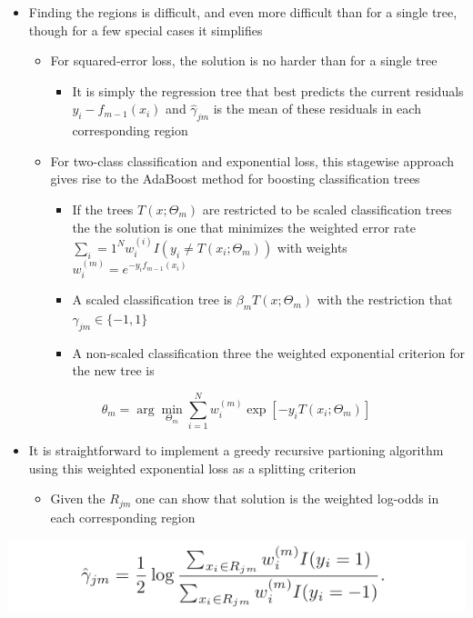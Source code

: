 \documentclass[11pt]{article}
\begin{document}
\begin{itemize}
\item Finding the regions is difficult, and even more difficult than for a single tree, though for a few special cases it simplifies
\begin{itemize}
\item For squared-error loss, the solution is no harder than for a single tree
\begin{itemize}
\item It is simply the regression tree that best predicts the current residuals \(y_i-f_{m-1}(x_i)\) and \(\hat \gamma _{jm}\) is the mean of these residuals in each corresponding region
\end{itemize}
\item For two-class classification and exponential loss, this stagewise approach gives rise to the AdaBoost method for boosting classification trees
\begin{itemize}
\item If the trees \(T(x; \Theta_m)\) are restricted to be scaled classification trees the the solution is one that minimizes the weighted error rate \(\sum_i=1^N w_i^{(i)} I(y_i \ne T(x_i;\Theta_m))\) with weights \(w_i^{(m)}= e^{-y_if_{m-1}(x_i)}\)
\item A scaled classification tree is \(\beta_mT(x;\Theta_m)\) with the restriction that \(\gamma_{jm} \in \{-1,1\}\)
\item A non-scaled classification three the weighted exponential criterion for the new tree is
\end{itemize}
\end{itemize}
\end{itemize}
\begin{equation}
  \hat \theta_m = \arg \min_{\Theta_m} \sum_{i=1}^N w_i^{(m)} \exp[-y_iT(x_i;\Theta_m)]
\end{equation}
\begin{itemize}
\item It is straightforward to implement a greedy recursive partioning algorithm using this weighted exponential loss as a splitting criterion
\begin{itemize}
\item Given the \(R_{jm}\) one can show that solution is the weighted log-odds in each corresponding region
\end{itemize}
\end{itemize}
\begin{center}
\includegraphics[width=.9\linewidth]{Boosting and Additive Trees/screenshot_2018-10-22_10-28-20.png}
\end{center}
\end{document}
